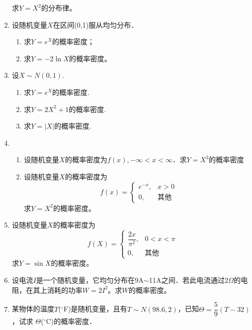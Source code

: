 \documentclass[10pt,a4paper]{article}
\begin{document}
\begin{enumerate}
    求$Y=X^2$的分布律。


    \item 设随机变量$X$在区间(0,1)服从均匀分布．
    \begin{enumerate}
        \item 求$Y=e^X$的概率密度；
        \item 求$Y=-2\ln X$的概率密度。
    \end{enumerate}


    \item 设$X\sim N(0,1)$.
    \begin{enumerate}
        \item 求$Y=e^X$的概率密度.
        \item 求$Y=2X^2+1$的概率密度.
        \item 求$Y=|X|$的概率密度.
    \end{enumerate}

    
    \item \begin{enumerate}
        \item 设随机变量$X$的概率密度为$f(x),-\infty < x<\infty$．求$Y=X^3$的概率密度
        \item 设随机变量$X$的概率密度为
        $$f(x)=\left\{\begin{array}{ll}
            e^{-x}, & x>0\\
            0, & \mbox{其他}
        \end{array}\right.$$
        求$Y=X^2$的概率密度。
    \end{enumerate}


    \item 设随机变量$X$的概率密度为
    $$f(X)=\left\{\begin{array}{ll}
        \dfrac{2x}{\pi ^2}, & 0<x <\pi\\
        0, & \mbox{其他}
    \end{array}\right.$$
    求$Y=\sin X$的概率密度。


    \item 设电流$I$是一个随机变量，它均匀分布在9A$\sim$11A之间．若此电流通过$2\Omega$的电
    阻，在其上消耗的功率$W=2I^2$。求$W$的概率密度。


    \item 某物体的温度$T$($^{\circ}$F)是随机变量，且有$T\sim N(98.6,2)$，已知$\varTheta =\dfrac{5}{9}(T-32)$，试求
    $\varTheta$($^{\circ}$C)的概率密度．






    



    
    


    

\end{enumerate}
\end{document}
